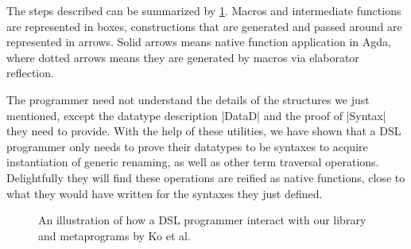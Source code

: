 \documentclass[sigplan,review,fleqn]{acmart}
\renewcommand{\verb}{\collectverb{\color{AgdaFunction}}}
\begin{document}
The steps described can be summarized by \cref{fig:flow}. 
Macros and intermediate functions are represented in boxes, constructions that are generated and passed around are represented in arrows.
Solid arrows means native function application in Agda, where dotted arrows means they are generated by macros via elaborator reflection.

The programmer need not understand the details of the structures we just mentioned, except the datatype description \verb|DataD| and the proof of \verb|Syntax| they need to provide.
With the help of these utilities, we have shown that a DSL programmer only needs to prove their datatypes to be syntaxes to acquire instantiation of generic renaming, as well as other term traversal operations.
Delightfully they will find these operations are reified as native functions, close to what they would have written for the syntaxes they just defined.

\begin{figure}
	\centering
	\caption{An illustration of how a DSL programmer interact with our library and metaprograms by Ko et al.}
	\label{fig:flow}
\end{figure}
\end{document}
